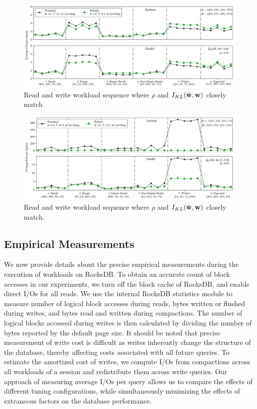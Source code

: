 \begin{figure}[h]
    \centering
    \includegraphics[scale=0.5]{figures/query_seq_hybrid_1.pdf}
    \caption{Read and write workload sequence where $\rho$ and
        $I_{KL}({{\hat{\bf{w}}}}, {{\bf{w}}})$ closely match.}
    \label{fig:query_seq_hybrid_1}
\end{figure}

\begin{figure}[h]
    \centering
    \includegraphics[scale=0.5]{figures/query_seq_hybrid_2.pdf}
    \caption{Read and write workload sequence where $\rho$ and
        $I_{KL}({{\hat{\bf{w}}}}, {{\bf{w}}})$ closely match.}
    \label{fig:query_seq_hybrid_2}
\end{figure}


\subsection{Empirical Measurements}
\label{sec:empirical_measurements}
We now provide details about the precise empirical measurements
    during the execution of workloads on RocksDB.
To obtain an accurate count of block accesses in our experiments, 
    we turn off the block cache of RocksDB, and enable direct I/Os for 
    all reads.
We use the internal RocksDB statistics module to measure number of logical block
    accesses during reads, bytes written or flushed during writes, and bytes
    read and written during compactions.
The number of logical blocks accessed during writes is then calculated by 
    dividing the number of bytes reported by the default page size.
It should be noted that precise measurement of write cost is difficult as writes
    inherently change the structure of the database, thereby affecting costs
    associated with all future queries.
To estimate the amortized cost of writes, we compute I/Os from compactions 
    across all workloads of a session and redistribute them across write queries.
Our approach of measuring average I/Os per query allows us to compare the
    effects of different tuning configurations, while simultaneously minimizing
    the effects of extraneous factors on the database performance.



